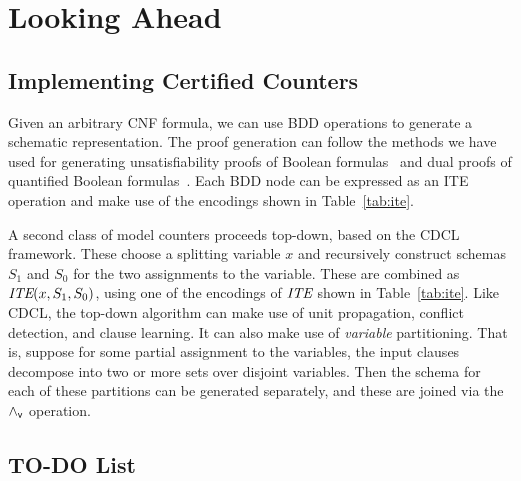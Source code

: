\documentclass{llncs}
\newcommand{\pand}{\mathbin{\land_{\sf v}}}
\newcommand{\ite}{\mbox{\it ITE}}
\begin{document}
\section{Looking Ahead}

\subsection{Implementing Certified Counters}

Given an arbitrary CNF formula, we can use BDD operations to generate
a schematic representation.  The proof generation can follow the
methods we have used for generating unsatisfiability proofs of Boolean
formulas~\cite{bryant:tacas:2021} and dual proofs of quantified
Boolean formulas~\cite{bryant:cade:2021}.
Each BDD node can be expressed as an ITE operation and
make use of the encodings shown in Table~\ref{tab:ite}.

A second class of model counters proceeds top-down, based on the CDCL
framework.  These choose a splitting variable $x$ and recursively
construct schemas $S_1$ and $S_0$ for the two assignments to the
variable.  These are combined as $\ite(x, S_1, S_0)$, using one of the
encodings of $\ite$ shown in Table~\ref{tab:ite}.  Like CDCL, the
top-down algorithm can make use of unit propagation, conflict
detection, and clause learning.  It can also make use of {\em
  variable} partitioning.  That is, suppose for some partial
assignment to the variables, the input clauses decompose into two or
more sets over disjoint variables.  Then the schema for each of these
partitions can be generated separately, and these are joined via the $\pand$
operation.



\subsection{TO-DO List}
\end{document}

